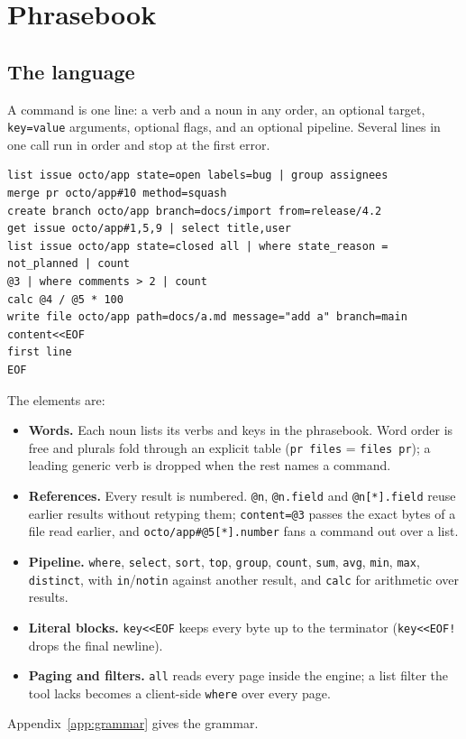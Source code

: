 \documentclass[11pt]{article}
\begin{document}
\section{Phrasebook}
\label{sec:design}

\subsection{The language}
A command is one line: a verb and a noun in any order, an optional target, \texttt{key=value} arguments, optional flags, and an optional pipeline. Several lines in one call run in order and stop at the first error.

\begin{lstlisting}
list issue octo/app state=open labels=bug | group assignees
merge pr octo/app#10 method=squash
create branch octo/app branch=docs/import from=release/4.2
get issue octo/app#1,5,9 | select title,user
list issue octo/app state=closed all | where state_reason = not_planned | count
@3 | where comments > 2 | count
calc @4 / @5 * 100
write file octo/app path=docs/a.md message="add a" branch=main content<<EOF
first line
EOF
\end{lstlisting}

The elements are:
\begin{itemize}
  \item \textbf{Words.} Each noun lists its verbs and keys in the phrasebook. Word order is free and plurals fold through an explicit table (\texttt{pr files} = \texttt{files pr}); a leading generic verb is dropped when the rest names a command.
  \item \textbf{References.} Every result is numbered. \texttt{@n}, \texttt{@n.field} and \texttt{@n[*].field} reuse earlier results without retyping them; \texttt{content=@3} passes the exact bytes of a file read earlier, and \texttt{octo/app\#@5[*].number} fans a command out over a list.
  \item \textbf{Pipeline.} \texttt{where}, \texttt{select}, \texttt{sort}, \texttt{top}, \texttt{group}, \texttt{count}, \texttt{sum}, \texttt{avg}, \texttt{min}, \texttt{max}, \texttt{distinct}, with \texttt{in}/\texttt{notin} against another result, and \texttt{calc} for arithmetic over results.
  \item \textbf{Literal blocks.} \texttt{key<<EOF} keeps every byte up to the terminator (\texttt{key<<EOF!} drops the final newline).
  \item \textbf{Paging and filters.} \texttt{all} reads every page inside the engine; a list filter the tool lacks becomes a client-side \texttt{where} over every page.
\end{itemize}
Appendix~\ref{app:grammar} gives the grammar.
\end{document}
